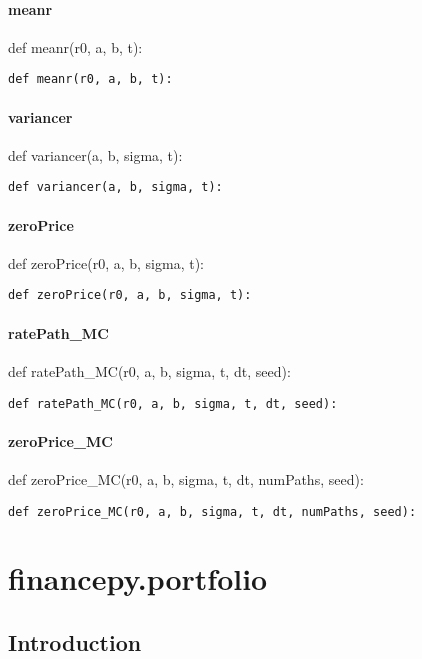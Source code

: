\documentclass[twoside,11pt]{book}
\begin{document}
\subsubsection*{{\bf meanr}}
def meanr(r0, a, b, t): 

\begin{lstlisting}
def meanr(r0, a, b, t):
\end{lstlisting}

\subsubsection*{{\bf variancer}}
def variancer(a, b, sigma, t): 

\begin{lstlisting}
def variancer(a, b, sigma, t):
\end{lstlisting}

\subsubsection*{{\bf zeroPrice}}
def zeroPrice(r0, a, b, sigma, t): 

\begin{lstlisting}
def zeroPrice(r0, a, b, sigma, t):
\end{lstlisting}

\subsubsection*{{\bf ratePath\_MC}}
def ratePath\_MC(r0, a, b, sigma, t, dt, seed): 

\begin{lstlisting}
def ratePath_MC(r0, a, b, sigma, t, dt, seed):
\end{lstlisting}

\subsubsection*{{\bf zeroPrice\_MC}}
def zeroPrice\_MC(r0, a, b, sigma, t, dt, numPaths, seed): 

\begin{lstlisting}
def zeroPrice_MC(r0, a, b, sigma, t, dt, numPaths, seed):
\end{lstlisting}


\chapter{financepy.portfolio}
\section{Introduction}
\end{document}
